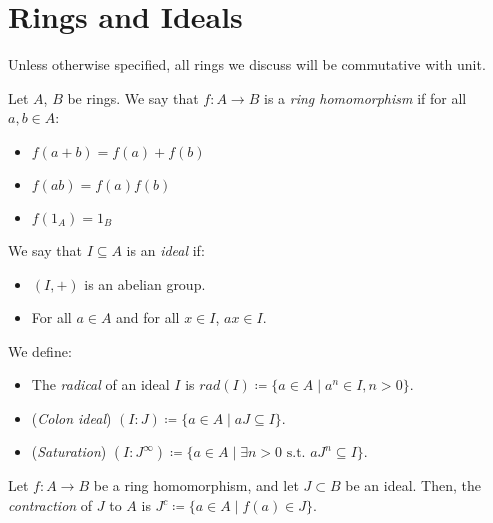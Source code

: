 \section{Rings and Ideals}\label{sec:rings-and-ideals}

        \begin{rk}
            Unless otherwise specified, all rings we discuss will be commutative with unit.
        \end{rk}

        \begin{defn}
            Let $A$, $B$ be rings.
            We say that $f: A \longrightarrow B$ is a \emph{ring homomorphism} if for all $a, b \in A$:
            \begin{itemize}
                \item $f(a+b) = f(a) + f(b)$
                \item $f(ab) = f(a) f(b)$
                \item $f(1_A) = 1_B$
            \end{itemize}
        \end{defn}

        \begin{defn}
            We say that $I \subseteq A$ is an \emph{ideal} if:
            \begin{itemize}
                \item $(I,+)$ is an abelian group.
                \item For all $a \in A$ and for all $x\in I$, $ax \in I$.
            \end{itemize}
        \end{defn}

        \begin{defn}
            We define:
            \begin{itemize}
                \item The \emph{radical} of an ideal $I$ is $rad(I) \coloneqq \{a \in A \mid a^{n} \in I, n > 0\}$.
                \item (\emph{Colon ideal}) $(I:J) \coloneqq \{a \in A \mid aJ \subseteq I\}$.
                \item (\emph{Saturation}) $(I:J^{\infty}) \coloneqq \{a \in A \mid \exists n > 0 \text{ s.t. } a J^n \subseteq I\}$.
            \end{itemize}
        \end{defn}

        \begin{defn}
            Let $f: A \rightarrow B$ be a ring homomorphism, and let $J \subset B$ be an ideal.
            Then, the \emph{contraction} of $J$ to $A$ is $J^{c} \coloneqq \{a \in A \mid f(a) \in J\}$.
        \end{defn}

